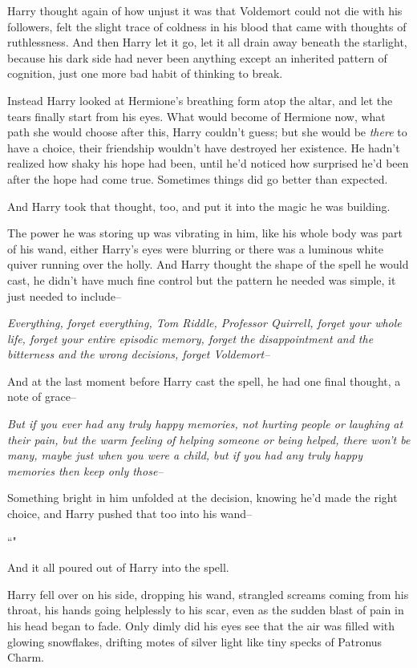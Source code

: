Harry thought again of how unjust it was that Voldemort could not die with his followers, felt the slight trace of coldness in his blood that came with thoughts of ruthlessness. And then Harry let it go, let it all drain away beneath the starlight, because his dark side had never been anything except an inherited pattern of cognition, just one more bad habit of thinking to break.

Instead Harry looked at Hermione's breathing form atop the altar, and let the tears finally start from his eyes. What would become of Hermione now, what path she would choose after this, Harry couldn't guess; but she would be \emph{there} to have a choice, their friendship wouldn't have destroyed her existence. He hadn't realized how shaky his hope had been, until he'd noticed how surprised he'd been after the hope had come true. Sometimes things did go better than expected.

And Harry took that thought, too, and put it into the magic he was building.

The power he was storing up was vibrating in him, like his whole body was part of his wand, either Harry's eyes were blurring or there was a luminous white quiver running over the holly. And Harry thought the shape of the spell he would cast, he didn't have much fine control but the pattern he needed was simple, it just needed to include\---

\emph{Everything, forget everything, Tom Riddle, Professor Quirrell, forget your whole life, forget your entire episodic memory, forget the disappointment and the bitterness and the wrong decisions, forget Voldemort\---}

And at the last moment before Harry cast the spell, he had one final thought, a note of grace\---

\emph{But if you ever had any truly happy memories, not hurting people or laughing at their pain, but the warm feeling of helping someone or being helped, there won't be many, maybe just when you were a child, but if you had any truly happy memories then keep only those\---}

Something bright in him unfolded at the decision, knowing he'd made the right choice, and Harry pushed that too into his wand\---

``\emph{}"

And it all poured out of Harry into the spell.

Harry fell over on his side, dropping his wand, strangled screams coming from his throat, his hands going helplessly to his scar, even as the sudden blast of pain in his head began to fade. Only dimly did his eyes see that the air was filled with glowing snowflakes, drifting motes of silver light like tiny specks of Patronus Charm.

